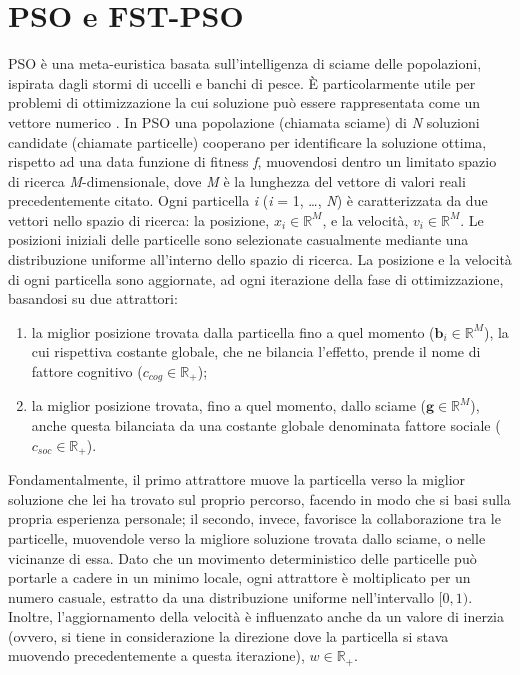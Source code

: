\section{PSO e FST-PSO}
\label{sec:fstpso}
PSO è una meta-euristica basata sull'intelligenza di sciame delle popolazioni, ispirata dagli stormi di uccelli e banchi di pesce. 
È particolarmente utile per problemi di ottimizzazione la cui soluzione può essere rappresentata come un vettore numerico \cite{Kennedy1995}. 
In PSO una popolazione (chiamata sciame) di \textit{N} soluzioni candidate (chiamate particelle) cooperano per identificare la soluzione ottima, rispetto ad una data funzione di fitness \textit{f}, muovendosi dentro un limitato spazio di ricerca \textit{M}-dimensionale, dove \textit{M} è la lunghezza del vettore di valori reali precedentemente citato. 
Ogni particella \textit{i} (\textit{i} = 1, \dots, \textit{N}) è caratterizzata da due vettori nello spazio di ricerca: la posizione, $x_i \in \mathbb{R}^\textit{M}$, e la velocità, $v_i \in \mathbb{R}^\textit{M}$. Le posizioni iniziali delle particelle sono selezionate casualmente mediante una distribuzione uniforme all'interno dello spazio di ricerca. 
La posizione e la velocità di ogni particella sono aggiornate, ad ogni iterazione della fase di ottimizzazione, basandosi su due attrattori: \begin{enumerate}
	\item la miglior posizione trovata dalla particella fino a quel momento ($\textbf{b}_i \in \mathbb{R}^\textit{M}$), la cui rispettiva costante globale, che ne bilancia l'effetto, prende il nome di fattore cognitivo ($c_{cog} \in \mathbb{R}_+$);
	\item la miglior posizione trovata, fino a quel momento, dallo sciame ($\textbf{g} \in \mathbb{R}^\textit{M}$), anche questa bilanciata da una costante globale denominata fattore sociale ($c_{soc} \in \mathbb{R}_+$).
\end{enumerate}
Fondamentalmente, il primo attrattore muove la particella verso la miglior soluzione che lei ha trovato sul proprio percorso, facendo in modo che si basi sulla propria esperienza personale; il secondo, invece, favorisce la collaborazione tra le particelle, muovendole verso la migliore soluzione trovata dallo sciame, o nelle vicinanze di essa. 
Dato che un movimento deterministico delle particelle può portarle a cadere in un minimo locale, ogni attrattore è moltiplicato per un numero casuale, estratto da una distribuzione uniforme nell'intervallo $[0, 1)$. 
Inoltre, l'aggiornamento della velocità è influenzato anche da un valore di inerzia (ovvero, si tiene in considerazione la direzione dove la particella si stava muovendo precedentemente a questa iterazione), $\textit{w} \in \mathbb{R}_+$. 
